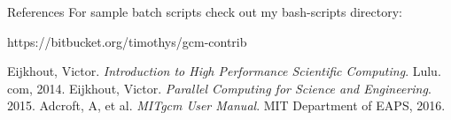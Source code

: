 \documentclass[pdf]{beamer}
\begin{document}

 \begin{frame}{References}
  For sample batch scripts check out my bash-scripts directory: 
  \begin{block}{}
  https://bitbucket.org/timothys/gcm-contrib
  \end{block}
  \begin{thebibliography}{3}
  Eijkhout, Victor. \textit{Introduction to High Performance Scientific Computing}. Lulu. com, 2014.
  Eijkhout, Victor. \textit{Parallel Computing for Science and Engineering}. 2015.
  Adcroft, A, et al. \textit{MITgcm User Manual}. MIT Department of EAPS, 2016. 
  \end{thebibliography}
 \end{frame}
\end{document}
